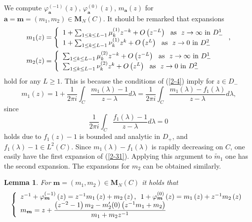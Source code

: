 \documentclass[a4paper]{article}%
\newtheorem{lemma}{Lemma}
\begin{document}
We compute $\varphi_{\boldsymbol{a}}^{\left(  -1\right)  }\left(  z\right)  $,
$\varphi_{\boldsymbol{a}}^{\left(  0\right)  }\left(  z\right)  $,
$m_{\boldsymbol{a}}\left(  z\right)  $ for $\boldsymbol{a}=\boldsymbol{m}%
=\left(  m_{1},m_{2}\right)  \in\boldsymbol{M}_{N}\left(  C\right)  $. It
should be remarked that expansions%
\begin{align}
m_{1}(z)  &  =\left\{
\begin{array}
[c]{l}%
1+\sum_{1\leq k\leq L-1}\mu_{k}^{\left(  1\right)  }z^{-k}+O\left(
z^{-L}\right)  \text{ \ as \ }z\rightarrow\infty\text{ in }D_{-}^{1}\\
1+\sum_{1\leq k\leq L-1}\nu_{k}^{\left(  1\right)  }z^{k}+O\left(
z^{L}\right)  \text{ \ as \ }z\rightarrow0\text{ in }D_{-}^{2}%
\end{array}
\right.  \text{,}\nonumber\\
m_{2}(z)  &  =\left\{
\begin{array}
[c]{l}%
\sum_{1\leq k\leq L-1}\mu_{k}^{\left(  2\right)  }z^{-k}+O\left(
z^{-L}\right)  \text{ \ as \ }z\rightarrow\infty\text{ in }D_{-}^{1}\\
\sum_{1\leq k\leq L-1}\nu_{k}^{\left(  2\right)  }z^{k}+O\left(  z^{L}\right)
\text{ \ as \ }z\rightarrow0\text{ in }D_{-}^{2}%
\end{array}
\right.  \label{2-31}%
\end{align}
hold for any $L\geq1$. This is because the conditions of (\ref{2-4}) imply for
$z\in D_{-}$%
\[
m_{1}(z)=1+\dfrac{1}{2\pi i}\int_{C}\dfrac{m_{1}(\lambda)-1}{z-\lambda
}d\lambda=\dfrac{1}{2\pi i}\int_{C}\dfrac{m_{1}(\lambda)-f_{1}(\lambda
)}{z-\lambda}d\lambda\text{,}%
\]
since
\[
\dfrac{1}{2\pi i}\int_{C}\dfrac{f_{1}(\lambda)-1}{z-\lambda}d\lambda=0
\]
holds due to $f_{1}(z)-1$ is bounded and analytic in $D_{+}$, and
$f_{1}(\lambda)-1\in L^{2}\left(  C\right)  $. Since $m_{1}(\lambda
)-f_{1}(\lambda)$ is rapidly decreasing on $C$, one easily have the first
expansion of (\ref{2-31}). Applying this argument to $\widetilde{m}_{1}$ one
has the second expansion. The expansions for $m_{2}$ can be obtained similarly.

\begin{lemma}
\label{l2-13}For $\boldsymbol{m}=\left(  m_{1},m_{2}\right)  \in
\boldsymbol{M}_{N}\left(  C\right)  $ it holds that%
\begin{equation}
\left\{
\begin{array}
[c]{l}%
z^{-1}+\varphi_{\boldsymbol{m}}^{\left(  -1\right)  }\left(  z\right)
=z^{-1}m_{1}\left(  z\right)  +m_{2}\left(  z\right)  \text{, \ }%
1+\varphi_{\boldsymbol{m}}^{\left(  0\right)  }\left(  z\right)  =m_{1}\left(
z\right)  +z^{-1}m_{2}\left(  z\right) \\
m_{\boldsymbol{m}}=z+\dfrac{\left(  z^{-2}-1\right)  m_{2}-m_{2}^{\prime
}(0)\left(  z^{-1}m_{1}+m_{2}\right)  }{m_{1}+m_{2}z^{-1}}%
\end{array}
\right.  \label{2-32}%
\end{equation}

\end{lemma}
\end{document}
